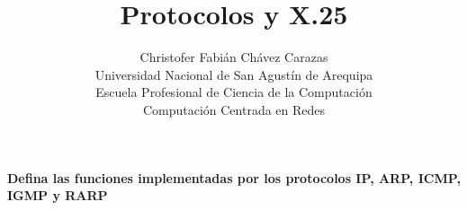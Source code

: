 \documentclass[a4paper,12pt]{article}
\begin{document}
\title{Protocolos y X.25}
\author{
Christofer Fabián Chávez Carazas \\
\small{Universidad Nacional de San Agustín de Arequipa} \\
\small{Escuela Profesional de Ciencia de la Computación} \\
\small{Computación Centrada en Redes}
}
\date{}

\maketitle

\begin{large}
 \textbf{Defina las funciones implementadas por los protocolos IP, ARP, ICMP, IGMP y RARP}
\end{large}
\end{document}
